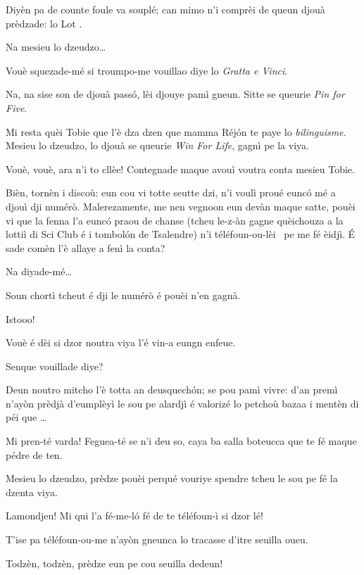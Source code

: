 \begin{drama}
\DzeudzoSenliquerspeaks Diyèn pa de counte foule va souplé; can mimo n’i comprèi de queun djouà prèdzade: lo Lot \lotto.

\Tobiespeaks Na mesieu lo dzeudzo\ldots

\DzeudzoSenliquerspeaks Vouè squezade-mé si troumpo-me vouillao diye lo \textit{Gratta e Vinci}.

\Tobiespeaks Na, na sise son de djouà passó, lèi djouye pamì gneun. Sitte se queurie \textit{Pin for Five}.

\Bertinaspeaks Mi resta quèi Tobie que l’è dza dzen que mamma Réjón te paye lo \textit{bilinguisme}.  Mesieu lo dzeudzo, lo djouà se queurie \textit{Win For Life}, gagnì pe la viya.

\DzeudzoSenliquerspeaks Vouè, vouè, ara n’i to cllèe! Contegnade maque avouì voutra conta mesieu Tobie.

\Tobiespeaks Bièn, tornèn i discoù: eun cou vi totte seutte dzi, n’i voulì proué eunc\'o mé a djouì  dji numérò. Malerezamente, me nen vegnoon eun devàn maque satte, pouèi vi que la fenna l'a eunc\'o praou de chanse (tcheu le-z-àn gagne quèichouza a la lottiì di Sci Club é i tombol\'on de Tsalendre) n’i téléfoun-ou-lèi \chiamare\ pe me fé èidjì. É sade comèn l’è allaye a fenì la conta?

\DzeudzoSenliquerspeaks Na diyade-mé\ldots

\Tobiespeaks Soun chortì tcheut é dji le numérò é pouèi n’en gagnà.

\DzeudzoSenliquerspeaks Istooo!

\Bertinaspeaks Vouè é dèi si dzor noutra viya l’é vin-a eungn enfeue.

\DzeudzoSenliquerspeaks Senque vouillade diye?

\Bertinaspeaks Deun noutro mitcho l’è totta an deusquechón; se pou pamì vivre: d'an premì n’ayòn prèdjà d'eumplèyì le sou pe alardjì é valorizé lo petchoù bazaa i mentèn di péi que \ldots

\Tobiespeaks Mi pren-té varda! Feguea-té se n’i deu so, caya ba salla boteucca que te fé maque pédre de ten.

\Bertinaspeaks Mesieu lo dzeudzo, prèdze pouèi perqué vouriye spen\-dre tcheu le sou pe fé la dzenta viya.

\Tobiespeaks Lamondjeu! Mi qui l'a fé-me-l\'o fé de te téléfoun-ì si dzor lé!

\Bertinaspeaks T'ise pa téléfoun-ou-me n’ayòn gneunca lo tracasse d’itre seuilla oueu.

\DzeudzoSenliquerspeaks {} Todzèn, todzèn, prèdze eun pe cou seuilla dedeun!


\end{drama}

